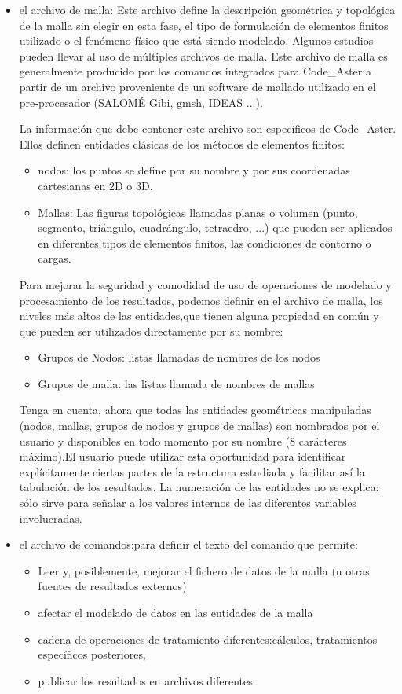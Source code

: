 \documentclass[12pt]{book}
\theoremstyle{definition}
\theoremstyle{remark}
\theoremstyle{plain}
\begin{document}
\begin{itemize}
 \item el archivo de malla:
Este archivo define la descripción geométrica y topológica de la malla sin elegir 
en esta fase, el tipo de formulación de elementos finitos utilizado o el fenómeno 
físico que está siendo modelado. Algunos estudios pueden llevar al uso de múltiples
 archivos de malla.
Este archivo de malla es generalmente producido por los comandos integrados para 
Code\_Aster a partir de un archivo proveniente de un software de mallado 
utilizado en el pre-procesador (SALOMÉ Gibi, gmsh, IDEAS ...).

La información que debe contener este archivo son específicos de Code\_Aster. Ellos 
definen entidades clásicas de los métodos de elementos finitos:
\begin{itemize}
 \item nodos: los puntos se define por su nombre y por sus coordenadas cartesianas en
2D o 3D.
 \item Mallas: Las figuras topológicas llamadas planas o volumen 
(punto, segmento, triángulo, cuadrángulo, tetraedro, ...) que pueden ser aplicados
 en diferentes tipos de elementos finitos, las condiciones de contorno o cargas.
\end{itemize}
Para mejorar la seguridad y comodidad de uso de operaciones de modelado y 
procesamiento de los resultados, podemos definir en el archivo de malla, los 
niveles más altos de las entidades,que tienen alguna propiedad en común y que pueden 
ser utilizados directamente por su nombre:

\begin{itemize}
 \item Grupos de Nodos: listas llamadas de nombres de los nodos
 \item Grupos de malla: las listas llamada de nombres de mallas
\end{itemize}
Tenga en cuenta, ahora que todas las entidades geométricas manipuladas (nodos,
mallas, grupos de nodos y grupos de mallas) son nombrados por el usuario y disponibles 
en todo momento por su nombre (8 carácteres máximo).El usuario puede utilizar esta
 oportunidad para identificar explícitamente ciertas partes de la estructura 
estudiada y facilitar así la tabulación de los resultados. La numeración de las entidades 
no se explica: sólo sirve para señalar a los valores internos de las diferentes variables 
involucradas.
 \item el archivo de comandos:para definir el texto del comando que permite:
\begin{itemize}
 \item Leer y, posiblemente, mejorar el fichero de datos de la malla (u otras fuentes de 
resultados externos)
 \item afectar el modelado de datos en las entidades de la malla
 \item  cadena de operaciones de tratamiento diferentes:cálculos, tratamientos específicos posteriores,
 \item publicar los resultados en archivos diferentes.
\end{itemize}


\end{itemize}
\end{document}
